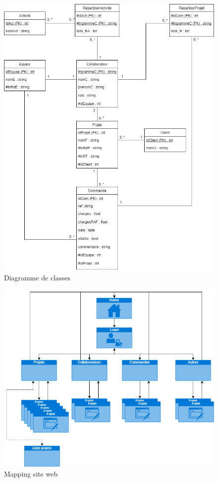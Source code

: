 \documentclass[french]{report}
\begin{document}
\begin{figure}[h]
  \begin{center}
    \includegraphics[width=\linewidth]{diagramme_class.png}
    \caption{Diagramme de classes}
    \label{fig:dc}
  \end{center}
\end{figure}

\begin{figure}[h]
  \begin{center}
    \includegraphics[width=\linewidth]{map.png}
    \caption{Mapping site web}
    \label{fig:map}
  \end{center}
\end{figure}
\end{document}
